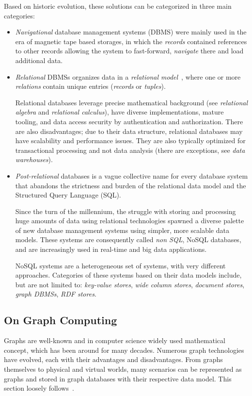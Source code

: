 Based on historic evolution, these solutions can be categorized in three main categories:
\begin{itemize}[topsep=0pt]
  \item \emph{Navigational} database management systems (DBMS) were mainly used in the era of magnetic tape based storages, in which the \emph{records} contained references to other records allowing the system to fast-forward, \emph{navigate} there and load additional data.

  \item \emph{Relational} DBMSs organizes data in a \emph{relational model}~\cite{codd}, where one or more \emph{relations} contain unique entries (\emph{records} or \emph{tuples}).

  Relational databases leverage precise mathematical background (see \emph{relational algebra} and \emph{relational calculus}), have diverse implementations, mature tooling, and data access security by authentication and authorization. There are also disadvantages; due to their data structure, relational databases may have scalability and performance issues. They are also typically optimized for transactional processing and not data analysis (there are exceptions, see \emph{data warehouses}).

  \item \emph{Post-relational} databases is a vague collective name for every database system that abandons the strictness and burden of the relational data model and the Structured Query Language (SQL).

  Since the turn of the millennium, the struggle with storing and processing huge amounts of data using relational technologies spawned a diverse palette of new database management systems using simpler, more scalable data models. These systems are consequently called \emph{non SQL}, NoSQL databases, and are increasingly used in real-time and big data applications.

  NoSQL systems are a heterogeneous set of systems, with very different approaches. Categories of these systems based on their data models include, but are not limited to: \emph{key-value stores}, \emph{wide column stores}, \emph{document stores}, \emph{graph DBMSs}, \emph{RDF stores}.
\end{itemize}

\subsection{On Graph Computing}
Graphs are well-known and in computer science widely used mathematical concept, which has been around for many decades. Numerous graph technologies have evolved, each with their advantages and disadvantages. From graphs themselves to physical and virtual worlds, many scenarios can be represented as graphs and stored in graph databases with their respective data model. This section loosely follows~\cite{scm, On_Graph_Computing}.

